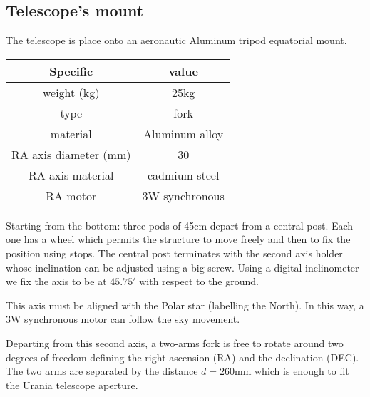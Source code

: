 \subsection{Telescope's mount}
The telescope is place onto an aeronautic Aluminum tripod equatorial mount.
\\
\begin{minipage}{.4\textwidth}
    \begin{tabular}{cc}
        Specific & value \\
        \hline
        weight (kg) & 25kg \\
        type & fork \\
        material & Aluminum alloy \\
        RA axis diameter (mm) & 30 \\
        RA axis material & cadmium steel \\
        RA motor & 3W synchronous \\
        \hline
    \end{tabular}
    \label{tab:mount}
\end{minipage}

Starting from the bottom: three pods of 45cm depart from a central post. Each one has a wheel which permits the structure to move freely and then to fix the position using stops.
The central post terminates with the second axis holder whose inclination can be adjusted using a big screw.
Using a digital inclinometer we fix the axis to be at \(45.75'\) with respect to the ground.

This axis must be aligned with the Polar star (labelling the North).
In this way, a 3W synchronous motor can follow the sky movement.

Departing from this second axis, a two-arms fork is free to rotate around two degrees-of-freedom defining the right ascension (RA) and the declination (DEC).
The two arms are separated by the distance \(d = 260\)mm which is enough to fit the Urania telescope aperture.
